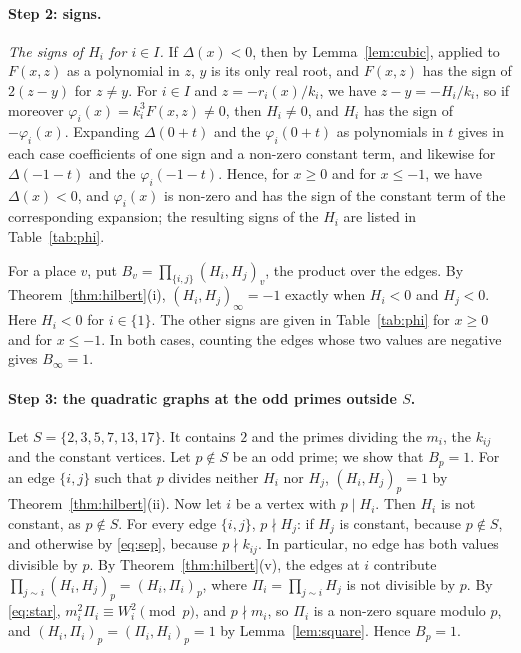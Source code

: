 \documentclass[11pt]{article}
\begin{document}
\paragraph{Step 2: signs.} \emph{The signs of $H_i$ for $i\in I$.} If $\Delta(x)<0$, then by Lemma~\ref{lem:cubic}, applied to $F(x,z)$ as a polynomial in $z$, $y$ is its only real root, and $F(x,z)$ has the sign of $2(z-y)$ for $z\neq y$. For $i\in I$ and $z=-r_i(x)/k_i$, we have $z-y=-H_i/k_i$, so if moreover $\varphi_i(x)=k_i^3F(x,z)\neq0$, then $H_i\neq0$, and $H_i$ has the sign of $-\varphi_i(x)$. Expanding $\Delta(0+t)$ and the $\varphi_i(0+t)$ as polynomials in $t$ gives in each case coefficients of one sign and a non-zero constant term, and likewise for $\Delta(-1-t)$ and the $\varphi_i(-1-t)$. Hence, for $x\geq0$ and for $x\leq-1$, we have $\Delta(x)<0$, and $\varphi_i(x)$ is non-zero and has the sign of the constant term of the corresponding expansion; the resulting signs of the $H_i$ are listed in Table~\ref{tab:phi}. 

For a place $v$, put $B_v=\prod_{\{i,j\}}(H_i,H_j)_v$, the product over the edges. By Theorem~\ref{thm:hilbert}(i), $(H_i,H_j)_\infty=-1$ exactly when $H_i<0$ and $H_j<0$. Here $H_i<0$ for $i\in\{1\}$. The other signs are given in Table~\ref{tab:phi} for $x\geq0$ and for $x\leq-1$. In both cases, counting the edges whose two values are negative gives $B_\infty=1$.

\paragraph{Step 3: the quadratic graphs at the odd primes outside $S$.} Let $S=\{2,\allowbreak 3,\allowbreak 5,\allowbreak 7,\allowbreak 13,\allowbreak 17\}$. It contains $2$ and the primes dividing the $m_{i}$, the $k_{ij}$ and the constant vertices. Let $p\notin S$ be an odd prime; we show that $B_p=1$. For an edge $\{i,j\}$ such that $p$ divides neither $H_i$ nor $H_j$, $(H_i,H_j)_p=1$ by Theorem~\ref{thm:hilbert}(ii). Now let $i$ be a vertex with $p\mid H_i$. Then $H_i$ is not constant, as $p\notin S$. For every edge $\{i,j\}$, $p\nmid H_j$: if $H_j$ is constant, because $p\notin S$, and otherwise by \eqref{eq:sep}, because $p\nmid k_{ij}$. In particular, no edge has both values divisible by $p$. By Theorem~\ref{thm:hilbert}(v), the edges at $i$ contribute $\prod_{j\sim i}(H_i,H_j)_p=(H_i,\Pi_i)_p$, where $\Pi_i=\prod_{j\sim i}H_j$ is not divisible by $p$. By \eqref{eq:star}, $m_i^2\Pi_i\equiv W_i^2\pmod p$, and $p\nmid m_i$, so $\Pi_i$ is a non-zero square modulo $p$, and $(H_i,\Pi_i)_p=(\Pi_i,H_i)_p=1$ by Lemma~\ref{lem:square}. Hence $B_p=1$.
\end{document}
